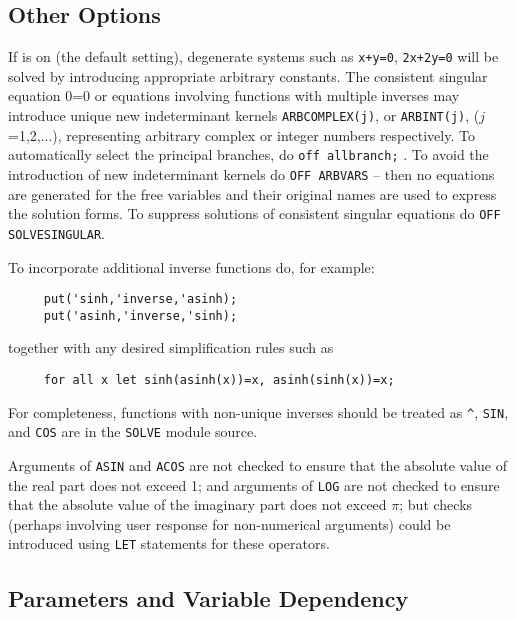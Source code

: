 \subsection{Other Options}
\hypertarget{switch:SOLVESINGULAR}{}
\hypertarget{switch:ALLBRANCH}{}
\hypertarget{switch:ARBVARS}{}
\hypertarget{operator:ARBCOMPLEX}{}
\hypertarget{operator:ARBINT}{}
If  is on (the default setting),
degenerate systems such as \texttt{x+y=0}, \texttt{2x+2y=0} will be solved by
introducing appropriate arbitrary constants.
The consistent singular equation 0=0 or equations involving functions with
multiple inverses may introduce unique new indeterminant kernels
\texttt{ARBCOMPLEX(j)}, or \texttt{ARBINT(j)}, ($j$=1,2,...),  %
representing arbitrary complex or integer numbers respectively.  To
automatically select the principal branches, do \texttt{off allbranch;} .
 To avoid the introduction of new indeterminant kernels
do \texttt{OFF ARBVARS} -- then no equations are generated for the free
variables and their original names are used to express the solution forms.
To suppress solutions of consistent singular equations do
\texttt{OFF SOLVESINGULAR}.

To incorporate additional inverse functions do, for example:
\begin{verbatim}
     put('sinh,'inverse,'asinh);
     put('asinh,'inverse,'sinh);
\end{verbatim}
together with any desired simplification rules such as
\begin{verbatim}
     for all x let sinh(asinh(x))=x, asinh(sinh(x))=x;
\end{verbatim}
For completeness, functions with non-unique inverses should be treated as
\texttt{\textasciicircum}, \texttt{SIN}, and \texttt{COS} are in the \texttt{SOLVE}
module source.

Arguments of \texttt{ASIN} and \texttt{ACOS} are not checked to ensure that the
absolute value of the real part does not exceed 1; and arguments of
\texttt{LOG} are not checked to  ensure that the absolute value of the imaginary
part does not exceed $\pi$; but checks (perhaps involving user response
for non-numerical arguments) could be introduced using
\texttt{LET} statements for these operators.

\subsection{Parameters and Variable Dependency}

